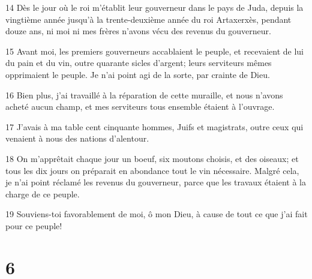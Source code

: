 \par 14 Dès le jour où le roi m'établit leur gouverneur dans le pays de Juda, depuis la vingtième année jusqu'à la trente-deuxième année du roi Artaxerxès, pendant douze ans, ni moi ni mes frères n'avons vécu des revenus du gouverneur.
\par 15 Avant moi, les premiers gouverneurs accablaient le peuple, et recevaient de lui du pain et du vin, outre quarante sicles d'argent; leurs serviteurs mêmes opprimaient le peuple. Je n'ai point agi de la sorte, par crainte de Dieu.
\par 16 Bien plus, j'ai travaillé à la réparation de cette muraille, et nous n'avons acheté aucun champ, et mes serviteurs tous ensemble étaient à l'ouvrage.
\par 17 J'avais à ma table cent cinquante hommes, Juifs et magistrats, outre ceux qui venaient à nous des nations d'alentour.
\par 18 On m'apprêtait chaque jour un boeuf, six moutons choisis, et des oiseaux; et tous les dix jours on préparait en abondance tout le vin nécessaire. Malgré cela, je n'ai point réclamé les revenus du gouverneur, parce que les travaux étaient à la charge de ce peuple.
\par 19 Souviens-toi favorablement de moi, ô mon Dieu, à cause de tout ce que j'ai fait pour ce peuple!

\chapter{6}

